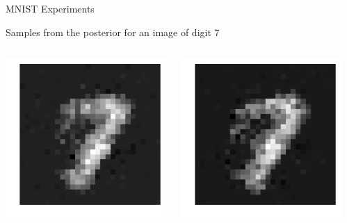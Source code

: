 \documentclass[9pt]{beamer}
\begin{document}
\begin{frame}{MNIST Experiments}
  \centering
  \begin{block}{Samples from the posterior for an image of digit 7}
    \begin{columns}
      \begin{column}{0.33\textwidth}
        \centering
        \includegraphics[width=0.75\columnwidth]{graphics/posterior_sample_0}
      \end{column}
      \begin{column}{0.33\textwidth}
        \centering
        \includegraphics[width=0.75\columnwidth]{graphics/posterior_sample_1}
      \end{column}
      \begin{column}{0.33\textwidth}
        \centering

\end{column}
\end{columns}
\end{block}
\end{frame}
\end{document}
